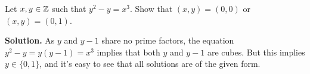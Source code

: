 \documentclass[a4paper,11pt]{article}
\begin{document}

Let $x,y \in \mathbb{Z}$ such that $y^2 -y  = x^3$. Show that $(x,y) = (0,0)$ or 
$(x,y) = (0,1)$. 

\textbf{Solution.} 
As $y$ and $y-1$ share no prime factors, the equation $y^2 - y = y(y-1) = x^3$
implies that both $y$ and $y-1$ are cubes. But this implies $y \in \{0, 1\}$,
and it's easy to see that all solutions are of the given form.

\contactend
\end{document}
